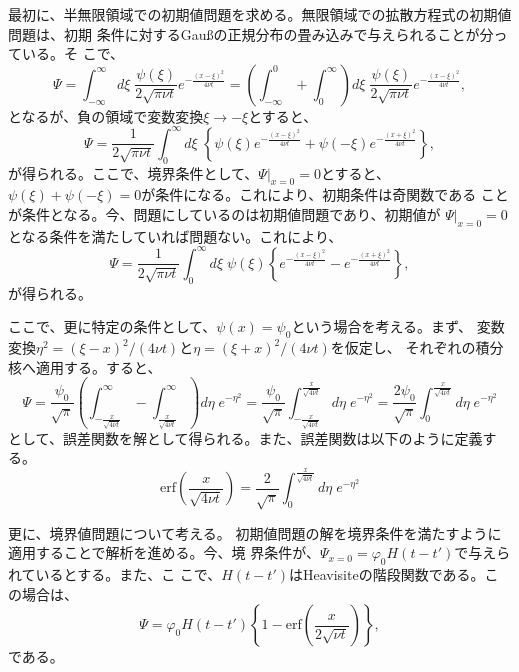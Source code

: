 最初に、半無限領域での初期値問題を求める。無限領域での拡散方程式の初期値問題は、初期
条件に対するGau\ss の正規分布の畳み込みで与えられることが分っている。そ
こで、
\begin{equation}
 \Psi = \int_{-\infty}^{\infty}d\xi\mspace{5mu}
  \frac{\psi(\xi)}{2\sqrt{\pi\nu t}}e^{-\frac{(x-\xi)^2}{4\nu t}}
  = \left(\int_{-\infty}^{0} + \int_{0}^{\infty}\right)d\xi\mspace{5mu}
  \frac{\psi(\xi)}{2\sqrt{\pi\nu t}}e^{-\frac{(x-\xi)^2}{4\nu t}},
\end{equation}
となるが、負の領域で変数変換$\xi\rightarrow -\xi$とすると、
\begin{equation}
 \Psi = \frac{1}{2\sqrt{\pi\nu t}}\int_{0}^{\infty}d\xi\mspace{5mu}
  \left\{\psi(\xi)e^{-\frac{(x-\xi)^2}{4\nu t}}+\psi(-\xi)e^{-\frac{(x+\xi)^2}{4\nu t}}\right\},
\end{equation}
が得られる。ここで、境界条件として、$\Psi|_{x=0}=0$とすると、
$\psi(\xi)+\psi(-\xi)=0$が条件になる。これにより、初期条件は奇関数である
ことが条件となる。今、問題にしているのは初期値問題であり、初期値が
$\Psi|_{x=0}=0$となる条件を満たしていれば問題ない。これにより、
\begin{equation}
  \Psi = \frac{1}{2\sqrt{\pi\nu t}}\int_{0}^{\infty}d\xi\mspace{5mu}
  \psi(\xi)\left\{e^{-\frac{(x-\xi)^2}{4\nu t}}-e^{-\frac{(x+\xi)^2}{4\nu t}}\right\},
\end{equation}
が得られる。

ここで、更に特定の条件として、$\psi(x)=\psi_0$という場合を考える。まず、
変数変換$\eta^2=(\xi-x)^2/(4\nu t)$と$\eta=(\xi+x)^2/(4\nu t)$を仮定し、
それぞれの積分核へ適用する。すると、
\begin{equation}
 \Psi = \frac{\psi_0}{\sqrt{\pi}}
  \left(\int_{-\frac{x}{\sqrt{4\nu t}}}^{\infty}-\int_{\frac{x}{\sqrt{4\nu t}}}^{\infty}\right)d\eta\mspace{5mu}
  e^{-\eta^2}
  = \frac{\psi_0}{\sqrt{\pi}}
  \int_{-\frac{x}{\sqrt{4\nu t}}}^{\frac{x}{\sqrt{4\nu t}}}d\eta\mspace{5mu}
  e^{-\eta^2}
  = \frac{2\psi_0}{\sqrt{\pi}}
  \int_{0}^{\frac{x}{\sqrt{4\nu t}}}d\eta\mspace{5mu}
  e^{-\eta^2}
\end{equation}
として、誤差関数を解として得られる。また、誤差関数は以下のように定義する。
\begin{equation}
  \text{erf}\left(\frac{x}{\sqrt{4\nu t}}\right) 
  = \frac{2}{\sqrt{\pi}}
  \int_{0}^{\frac{x}{\sqrt{4\nu t}}}d\eta\mspace{5mu}
  e^{-\eta^2}
\end{equation}


更に、境界値問題について考える。
初期値問題の解を境界条件を満たすように適用することで解析を進める。今、境
界条件が、$\Psi_{x=0}=\varphi_0H(t-t')$で与えられているとする。また、こ
こで、$H(t-t')$はHeavisiteの階段関数である。この場合は、
\begin{equation}
 \Psi = \varphi_0H(t-t')
  \left\{1-\text{erf}\left(\frac{x}{2\sqrt{\nu t}}\right)\right\},
\end{equation}
である。

